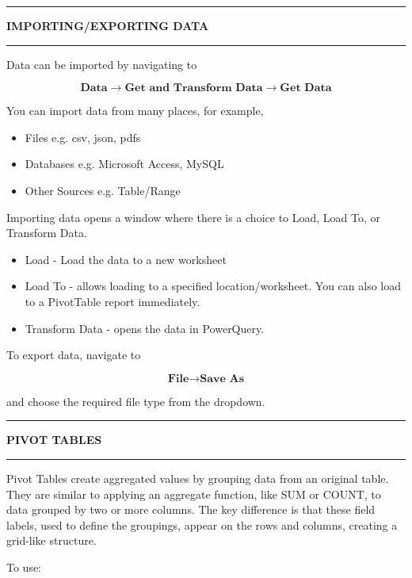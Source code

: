 \documentclass[8pt]{extarticle}
\newcommand{\heading}[1]{%
    \noindent
    \rule{\linewidth}{0.4pt}
    \begin{center}
        \vspace{-1ex}
        \textbf{#1}        
        \vspace{-2.5ex}
    \end{center}
    \rule{\linewidth}{0.4pt}
}
\begin{document}
\begin{multicols}{3}
\heading{IMPORTING/EXPORTING DATA}

Data can be imported by navigating to

\[ \textbf{Data} \rightarrow \textbf{Get and Transform Data} \rightarrow \textbf{Get Data} \]

You can import data from many places, for example,

\begin{itemize}
    \item Files e.g. csv, json, pdfs
    \item Databases e.g. Microsoft Access, MySQL
    \item Other Sources e.g. Table/Range 
\end{itemize}

Importing data opens a window where there is a choice to Load, Load To, or Transform Data. 

\begin{itemize}
    \item Load - Load the data to a new worksheet
    \item Load To - allows loading to a specified location/worksheet. You can also load to a PivotTable report immediately.
    \item Transform Data - opens the data in PowerQuery.
\end{itemize}

To export data, navigate to 

\[\textbf{File} \rightarrow \textbf{Save As} \]

and choose the required file type from the dropdown.

\columnbreak
\heading{PIVOT TABLES}

Pivot Tables create aggregated values by grouping data from an original table. They are similar to applying an aggregate function, like SUM or COUNT, to data grouped by two or more columns. The key difference is that these field labels, used to define the groupings, appear on the rows and columns, creating a grid-like structure.

To use: 


\end{multicols}
\end{document}

